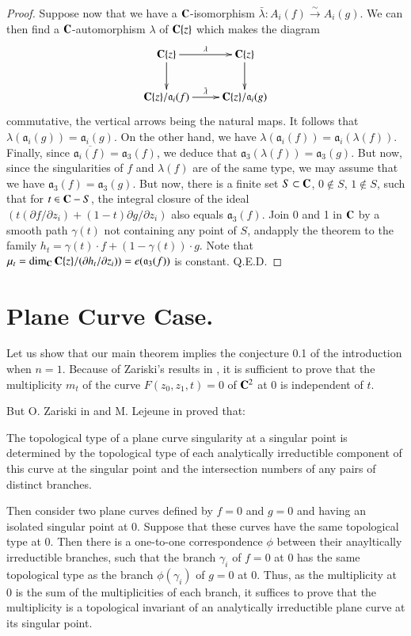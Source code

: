 \begin{proof}
Suppose now that we have a $\mathbf{C}$-isomorphism $\bar{\lambda}: A_i(f) \xrightarrow{\sim} A_i (g)$. We can then find a $\mathbf{C}$-automorphism $\lambda$ of $\mathbf{C}\{z\}$ which makes the diagram
\[
\xymatrix{
\bfC \{z\} \ar[r]^\lambda  \ar[d] & \bfC\{z\}\ar[d]\\
\bfC \{z\} / \mathfrak{a}_i (f) \ar[r]^{\bar\lambda} & \bfC\{z\} / \mathfrak{a}_i (g)
}
\]
commutative, the vertical arrows being the natural maps. It follows that $\lambda (\mathfrak{a}_i (g))= \mathfrak{a}_i (g)$. On the other hand, we have $\lambda (\mathfrak{a}_i (f)) = \mathfrak{a}_i (\lambda (f))$. Finally, since $\overline{\mathfrak{a}_i(f)} = \mathfrak{a}_3 (f)$, we deduce that $\mathfrak{a}_3 (\lambda (f)) = \mathfrak{a}_3 (g)$. But now, since the singularities of $f$ and $\lambda(f)$ are of the same type, we may assume that we have $\mathfrak{a}_3(f) = \mathfrak{a}_3 (g)$. But now, there is a finite set $S \subset \mathbf{C}$, $0 \notin S$, $1 \notin S$, such that for $t \in \mathbf{C} - S$, the integral closure of the ideal $(t (\partial f/ \partial z_i) + (1-t)\partial g  / \partial z_i)$ also equals $\mathfrak{a}_3 (f)$. Join 0 and 1 in $\mathbf{C}$ by a smooth path $\gamma (t)$ not containing any point of $S$, and\pageoriginale apply the theorem to the family $h_t = \gamma (t) \cdot f + (1 - \gamma (t)) \cdot g$. Note that $\mu_t =\dim_{\mathbf{C}} \mathbf{C} \{z\}/ (\partial h_t/ \partial z_i)) = e(\mathfrak{a}_3 (f))$ is constant. \hfill{Q.E.D.}
\end{proof}

\section{Plane Curve Case.}\label{art10-sec3}
Let us show that our main theorem implies the conjecture 0.1 of the introduction when $n=1$. Because of Zariski's results in \cite{art10-key19}, it is sufficient to prove that the multiplicity $m_t$ of the curve $F(z_0, z_1, t) =0$ of $\mathbf{C}^2$ at 0 is independent of $t$.

But O. Zariski in \cite{art10-key21} and M. Lejeune in \cite{art10-key6} proved that:

\begin{thm}\label{art10-thm3.1}
The topological type of a plane curve singularity at a singular point is determined by the topological type of each analytically irreductible component of this curve at the singular point and the intersection numbers of any pairs of distinct branches.
\end{thm}

Then consider two plane curves defined by $f=0$ and $g=0$ and having an isolated singular point at 0. Suppose that these curves have the same topological type at 0. Then there is a one-to-one correspondence $\phi$ between their anayltically irreductible branches, such that the branch $\gamma_i$ of $f=0$ at 0 has the same topological type as the branch $\phi (\gamma_i)$ of $g=0$ at 0. Thus, as the multiplicity at 0 is the sum of the multiplicities of each branch, it suffices to prove that the multiplicity is a topological invariant of an analytically irreductible plane curve at its singular point.

